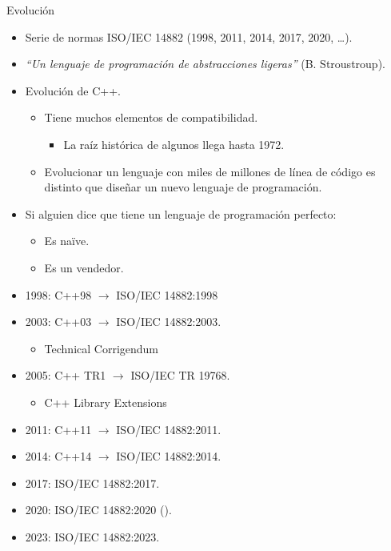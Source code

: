 \begin{frame}{Evolución}
\vspace{-0.5em}
\begin{itemize}
  \item Serie de normas ISO/IEC 14882 (1998, 2011, 2014, 2017, 2020, \ldots).
  \item \emph{``Un lenguaje de programación de abstracciones ligeras''} (B. Stroustroup).
  \item Evolución de C++.
    \begin{itemize}
      \item Tiene muchos elementos de compatibilidad.
        \begin{itemize}
          \item La raíz histórica de algunos llega hasta 1972.
        \end{itemize}
      \item Evolucionar un lenguaje con miles de millones de línea de código es
      distinto que diseñar un nuevo lenguaje de programación.
    \end{itemize}
  \item Si alguien dice que tiene un lenguaje de programación perfecto:
    \begin{itemize}
      \item Es na\"{i}ve.
      \item Es un vendedor.
    \end{itemize}
\end{itemize}
\end{frame}

\begin{frame}
\begin{itemize}
  \item 1998: C++98 $\rightarrow$ ISO/IEC 14882:1998
  \item 2003: C++03 $\rightarrow$ ISO/IEC 14882:2003.
    \begin{itemize}
      \item Technical Corrigendum
    \end{itemize}
  \item 2005: C++ TR1 $\rightarrow$ ISO/IEC TR 19768.
    \begin{itemize}
      \item C++ Library Extensions
    \end{itemize}
  \item 2011: C++11 $\rightarrow$ ISO/IEC 14882:2011.
  \item 2014: C++14 $\rightarrow$ ISO/IEC 14882:2014. 
  \item 2017: ISO/IEC 14882:2017.
  \item 2020: ISO/IEC 14882:2020 ().
  \item 2023:  ISO/IEC 14882:2023.
\end{itemize}
\end{frame}

